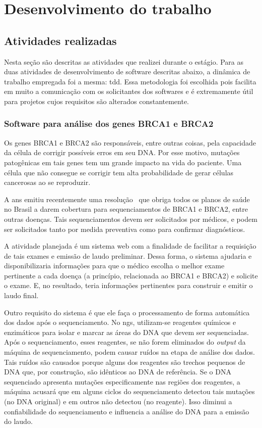 \chapter{Desenvolvimento do trabalho}
\label{chap:atividadesRealizadas}


\section{Atividades realizadas}

Nesta seção são descritas as atividades que realizei durante o estágio. Para as duas atividades de desenvolvimento de software descritas abaixo,
a dinâmica de trabalho empregada foi a mesma: \gls{tdd}. Essa metodologia foi escolhida pois facilita em muito a comunicação com os solicitantes
dos softwares e é extremamente útil para projetos cujos requisitos são alterados constantemente.

\subsection{Software para análise dos genes BRCA1 e BRCA2}

Os genes BRCA1 e BRCA2 são responsáveis, entre outras coisas, pela capacidade da célula de corrigir possíveis erros em
seu DNA. Por esse motivo, mutações patogênicas em tais genes tem um grande impacto na vida do paciente. Uma célula que
não consegue se corrigir tem alta probabilidade de gerar células cancerosas ao se reproduzir.

A \gls{ans} emitiu recentemente uma resolução~\cite{RolANS} que obriga todos os planos de saúde no Brasil a darem cobertura para
sequenciamentos de BRCA1 e BRCA2, entre outras doenças. Tais sequenciamentos devem ser solicitados por médicos, e podem ser solicitados
tanto por medida preventiva como para confirmar diagnósticos.

A atividade planejada é um sistema web com a finalidade de facilitar a requisição de tais exames e emissão de laudo preliminar.
Dessa forma, o sistema ajudaria e disponibilizaria informações para que o médico escolha o melhor exame pertinente a cada doença (a princípio,
relacionada ao BRCA1 e BRCA2) e solicite o exame. E, no resultado, teria informações pertinentes para construir e emitir o laudo final.

Outro requisito do sistema é que ele faça o processamento de forma automática dos dados após o sequenciamento. No \gls{ngs}, utilizam-se
reagentes químicos e enzimáticos para isolar e marcar as áreas do DNA que devem ser sequenciadas. Após o sequenciamento, esses reagentes, se
não forem eliminados do \textit{output} da máquina de sequenciamento, podem causar ruídos na etapa de análise dos dados. Tais ruídos
são causados porque alguns dos reagentes são trechos pequenos de DNA que, por construção, são idênticos ao DNA de referência. Se o DNA
sequenciado apresenta mutações especificamente nas regiões dos reagentes, a máquina acusará que em alguns ciclos do sequenciamento detectou
tais mutações (no DNA original) e em outros não detectou (no reagente). Isso diminui a confiabilidade do sequenciamento e influencia
a análise do DNA para a emissão do laudo.

